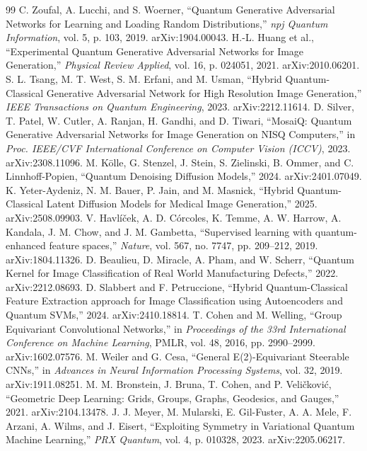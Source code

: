 \documentclass[11pt]{article}
\begin{document}
\begin{thebibliography}{99}
 C. Zoufal, A. Lucchi, and S. Woerner, ``Quantum Generative Adversarial Networks for Learning and Loading Random Distributions,'' \textit{npj Quantum Information}, vol. 5, p. 103, 2019. arXiv:1904.00043.
 H.-L. Huang et al., ``Experimental Quantum Generative Adversarial Networks for Image Generation,'' \textit{Physical Review Applied}, vol. 16, p. 024051, 2021. arXiv:2010.06201.
 S. L. Tsang, M. T. West, S. M. Erfani, and M. Usman, ``Hybrid Quantum-Classical Generative Adversarial Network for High Resolution Image Generation,'' \textit{IEEE Transactions on Quantum Engineering}, 2023. arXiv:2212.11614.
 D. Silver, T. Patel, W. Cutler, A. Ranjan, H. Gandhi, and D. Tiwari, ``MosaiQ: Quantum Generative Adversarial Networks for Image Generation on NISQ Computers,'' in \textit{Proc. IEEE/CVF International Conference on Computer Vision (ICCV)}, 2023. arXiv:2308.11096.
 M. K\"olle, G. Stenzel, J. Stein, S. Zielinski, B. Ommer, and C. Linnhoff-Popien, ``Quantum Denoising Diffusion Models,'' 2024. arXiv:2401.07049.
 K. Yeter-Aydeniz, N. M. Bauer, P. Jain, and M. Masnick, ``Hybrid Quantum-Classical Latent Diffusion Models for Medical Image Generation,'' 2025. arXiv:2508.09903.
 V. Havl{\'i}{\v c}ek, A. D. C{\'o}rcoles, K. Temme, A. W. Harrow, A. Kandala, J. M. Chow, and J. M. Gambetta, ``Supervised learning with quantum-enhanced feature spaces,'' \textit{Nature}, vol. 567, no. 7747, pp. 209--212, 2019. arXiv:1804.11326.
 D. Beaulieu, D. Miracle, A. Pham, and W. Scherr, ``Quantum Kernel for Image Classification of Real World Manufacturing Defects,'' 2022. arXiv:2212.08693.
 D. Slabbert and F. Petruccione, ``Hybrid Quantum-Classical Feature Extraction approach for Image Classification using Autoencoders and Quantum SVMs,'' 2024. arXiv:2410.18814.
 T. Cohen and M. Welling, ``Group Equivariant Convolutional Networks,'' in \textit{Proceedings of the 33rd International Conference on Machine Learning}, PMLR, vol. 48, 2016, pp. 2990--2999. arXiv:1602.07576.
 M. Weiler and G. Cesa, ``General E(2)-Equivariant Steerable CNNs,'' in \textit{Advances in Neural Information Processing Systems}, vol. 32, 2019. arXiv:1911.08251.
 M. M. Bronstein, J. Bruna, T. Cohen, and P. Veli\v{c}kovi\'c, ``Geometric Deep Learning: Grids, Groups, Graphs, Geodesics, and Gauges,'' 2021. arXiv:2104.13478.
 J. J. Meyer, M. Mularski, E. Gil-Fuster, A. A. Mele, F. Arzani, A. Wilms, and J. Eisert, ``Exploiting Symmetry in Variational Quantum Machine Learning,'' \textit{PRX Quantum}, vol. 4, p. 010328, 2023. arXiv:2205.06217.

\end{thebibliography}
\end{document}
